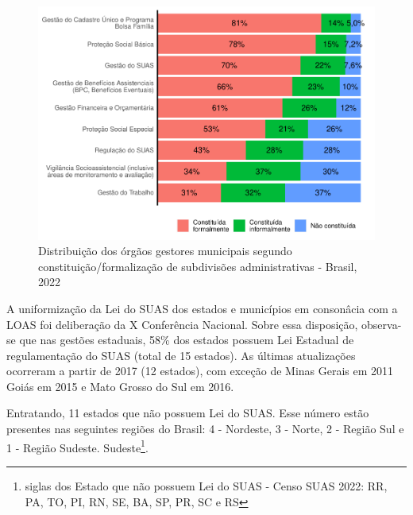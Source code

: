 \documentclass[
  brazilian]{report}
\begin{document}
\begin{figure}
\includegraphics{Censo-SUAS-2022_files/figure-latex/municipais-constituicao-subdivisoes-1} \caption[Distribuição dos órgãos gestores municipais segundo constituição/formalização de subdivisões administrativas - Brasil, 2022]{Distribuição dos órgãos gestores municipais segundo constituição/formalização de subdivisões administrativas - Brasil, 2022}\label{fig:municipais-constituicao-subdivisoes}
\end{figure}

A uniformização da Lei do SUAS dos estados e municípios em consonâcia
com a LOAS foi deliberação da X Conferência Nacional. Sobre essa
disposição, observa-se que nas gestões estaduais, 58\% dos estados
possuem Lei Estadual de regulamentação do SUAS (total de 15 estados). As
últimas atualizações ocorreram a partir de 2017 (12 estados), com
exceção de Minas Gerais em 2011 Goiás em 2015 e Mato Grosso do Sul em
2016.

Entratando, 11 estados que não possuem Lei do SUAS. Esse número estão
presentes nas seguintes regiões do Brasil: 4 - Nordeste, 3 - Norte, 2 -
Região Sul e 1 - Região Sudeste.
Sudeste\footnote{siglas dos Estado que não possuem Lei do SUAS - Censo SUAS 2022: RR, PA, TO, PI, RN, SE, BA, SP, PR, SC e RS}.
\end{document}
